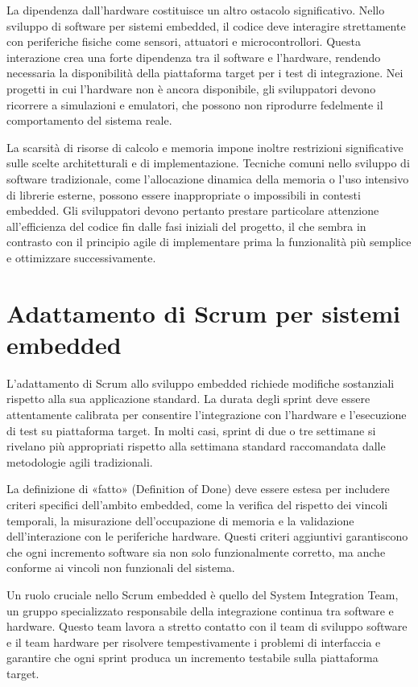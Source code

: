 \documentclass[
    language=italian,
    doctype=article,
]{../../omnilatex}
\begin{document}
La dipendenza dall'hardware costituisce un altro ostacolo significativo. Nello sviluppo di software per sistemi embedded, il codice deve interagire strettamente con periferiche fisiche come sensori, attuatori e microcontrollori. Questa interazione crea una forte dipendenza tra il software e l'hardware, rendendo necessaria la disponibilità della piattaforma target per i test di integrazione. Nei progetti in cui l'hardware non è ancora disponibile, gli sviluppatori devono ricorrere a simulazioni e emulatori, che possono non riprodurre fedelmente il comportamento del sistema reale.

La scarsità di risorse di calcolo e memoria impone inoltre restrizioni significative sulle scelte architetturali e di implementazione. Tecniche comuni nello sviluppo di software tradizionale, come l'allocazione dinamica della memoria o l'uso intensivo di librerie esterne, possono essere inappropriate o impossibili in contesti embedded. Gli sviluppatori devono pertanto prestare particolare attenzione all'efficienza del codice fin dalle fasi iniziali del progetto, il che sembra in contrasto con il principio agile di implementare prima la funzionalità più semplice e ottimizzare successivamente.

\section{Adattamento di Scrum per sistemi embedded}
L'adattamento di Scrum allo sviluppo embedded richiede modifiche sostanziali rispetto alla sua applicazione standard. La durata degli sprint deve essere attentamente calibrata per consentire l'integrazione con l'hardware e l'esecuzione di test su piattaforma target. In molti casi, sprint di due o tre settimane si rivelano più appropriati rispetto alla settimana standard raccomandata dalle metodologie agili tradizionali.

La definizione di «fatto» (Definition of Done) deve essere estesa per includere criteri specifici dell'ambito embedded, come la verifica del rispetto dei vincoli temporali, la misurazione dell'occupazione di memoria e la validazione dell'interazione con le periferiche hardware. Questi criteri aggiuntivi garantiscono che ogni incremento software sia non solo funzionalmente corretto, ma anche conforme ai vincoli non funzionali del sistema.

Un ruolo cruciale nello Scrum embedded è quello del System Integration Team, un gruppo specializzato responsabile della integrazione continua tra software e hardware. Questo team lavora a stretto contatto con il team di sviluppo software e il team hardware per risolvere tempestivamente i problemi di interfaccia e garantire che ogni sprint produca un incremento testabile sulla piattaforma target.
\end{document}

